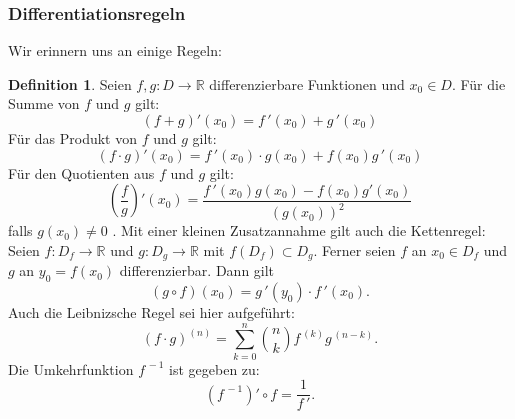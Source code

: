 \documentclass[fontsize=12pt,paper=a4,twoside,bibtotoc,idxtotoc,
liststotoc,pagesize,BCOR1.2cm,DIV15,chapterprefix,pagesize=pdftex]{scrbook}
\theoremstyle{plain}
\theoremstyle{definition}
\newtheorem{df}[equation]{Definition}
\theoremstyle{remark}
\begin{document}
\subsubsection{Differentiationsregeln}
Wir erinnern uns an einige Regeln:
\begin{df}
Seien $f,g:D \rightarrow \mathbb{R}$ differenzierbare Funktionen und
$x_0 \in D$. 
Für die Summe von $f$ und $g$ gilt:
 \[(f+g)'(x_0)=f\,'(x_0)+ g\,'(x_0)\]
Für das Produkt von $f$ und $g$ gilt:
 \[(f \cdot g)'(x_0) = f\,'(x_0) \cdot g(x_0) + f(x_0)g\,'(x_0)\] 
Für den Quotienten aus $f$ und $g$ gilt:
 \[\left(\frac{f}{g}\right)'(x_0) = \frac{f\,'(x_0) g(x_0) - f(x_0)
g'(x_0)}{(g(x_0))^2}\]
falls $g(x_0) \neq 0$ .
Mit einer kleinen Zusatzannahme gilt auch die Kettenregel:
Seien $f:D_f \rightarrow \mathbb{R}$ und $g:D_g
\rightarrow \mathbb{R}$ mit $f(D_f) \subset D_g$. Ferner seien $f$ an
$x_0 \in D_f$ und $g$ an $y_0=f(x_0)$ differenzierbar. Dann gilt
\[ (g \circ f)(x_0) = g\,'(y_0) \cdot f\,'(x_0).  \]
 Auch die Leibnizsche Regel sei hier aufgeführt:
\[
(f \cdot g)^{(n)} = \sum_{k=0}^n \binom{n}{k} f^{\,(k)} g^{\,(n-k)}.
\]
 Die Umkehrfunktion $f^{\,-1}$ ist gegeben zu:
\[(f^{\,-1})' \circ f = \frac{1}{f\,'}.\]
\end{df}
\end{document}
